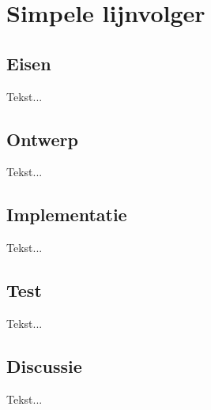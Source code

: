 \chapter[Simpele lijnvolger]{Simpele lijnvolger} \label {chapter:lijnvolger}

	\section{Eisen}
		Tekst...
	\section{Ontwerp}
		Tekst...
	\section{Implementatie}
			Tekst...
	\section{Test}
			Tekst...
	\section{Discussie}
			Tekst...
